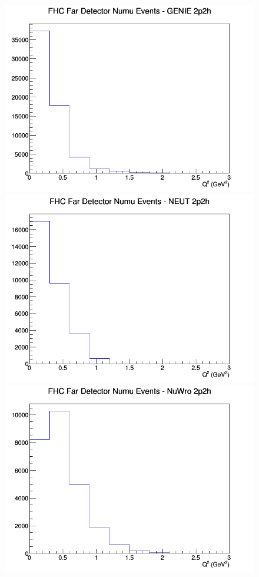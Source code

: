 \begin{figure}[h]
\endminipage
\newline
{}
\includegraphics[width=\linewidth]{Q2/nominal/2p2h_FHC_FD_numu_Q2_GENIE.png}
\endminipage
{}
\includegraphics[width=\linewidth]{Q2/nominal/2p2h_FHC_FD_numu_Q2_NEUT.png}
\endminipage
{}
\includegraphics[width=\linewidth]{Q2/nominal/2p2h_FHC_FD_numu_Q2_NuWro.png}

\end{figure}
